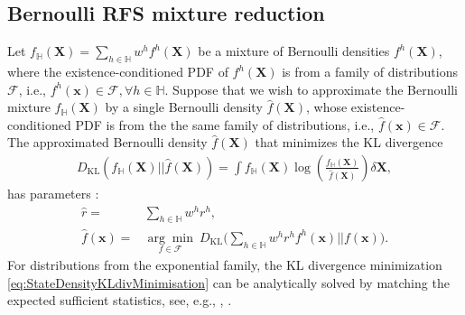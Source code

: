 \documentclass[journal]{IEEEtran}
\newcommand{\setX}{\mathbf{X}}
\newcommand{\sx}{\mathbf{x}}
\begin{document}
\subsection{Bernoulli RFS mixture reduction}
\label{sec:bmr}
Let $f_{\mathbb{H}}(\setX) = \sum_{h\in\mathbb{H}} w^{h} f^{h}(\setX)$ be a mixture of Bernoulli densities $f^{h}(\setX)$, where the existence-conditioned PDF of $f^{h}(\setX)$ is from a family of distributions $\mathcal{F}$, i.e., $f^{h}(\mathbf{x})\in\mathcal{F}, \forall h\in\mathbb{H}$. Suppose that we wish to approximate the Bernoulli mixture $f_{\mathbb{H}}(\setX)$ by a single Bernoulli density $\hat{f}(\setX)$, whose existence-conditioned PDF is from the the same family of distributions, i.e., $\hat{f}(\mathbf{x})\in\mathcal{F}$. The approximated Bernoulli density $\hat{f}(\setX)$ that minimizes the KL divergence
\begin{align}
    D_{\text{KL}}(f_{\mathbb{H}}(\setX) || \hat{f}(\setX) ) = \int f_{\mathbb{H}}(\setX) \log\left( \frac{f_{\mathbb{H}}(\setX)}{\hat{f}(\setX)} \right) \delta \setX,
    \label{eq:klmr}
\end{align}
has parameters \cite{pmbmpoint}:
\begin{subequations}
\begin{align}
    \hat{r} = & \sum_{h\in\mathbb{H}} w^{h}r^{h}, \label{eq:epmr}\\
    \hat{f}(\sx) = & \underset{f\in\mathcal{F}}{\arg\min}~D_{\text{KL}} \bigg(  \sum_{h\in\mathbb{H}} w^{h} r^{h} f^{h}(\sx)  || f(\sx) \bigg). \label{eq:StateDensityKLdivMinimisation}
\end{align}
\label{eq:approximatedBernoulli}%
\end{subequations}
For distributions from the exponential family, the KL divergence minimization \eqref{eq:StateDensityKLdivMinimisation} can be analytically solved by matching the expected sufficient statistics, see, e.g.,  \cite[Section 10.7]{Bishop:2006}, \cite{ArdeshiriGOO:2015}. 


\end{document}
